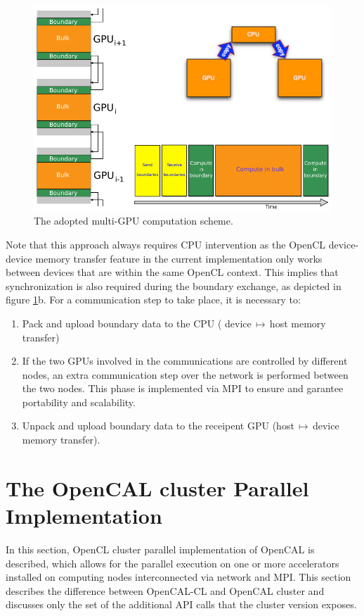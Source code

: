 \begin{figure}
	\centering
		\includegraphics[width=1.0\textwidth]{./images/opencal/multigpu_naive_exchange.png}
		\caption{The adopted multi-GPU computation scheme.}
		\label{fig:multigpu_naive_exchange}
\end{figure}


Note that this approach always requires CPU intervention as the OpenCL device-device memory transfer feature in the current implementation only works between devices that are within the same OpenCL context. This implies that synchronization is also required during the boundary exchange, as depicted in figure \ref{fig:multigpu_naive_exchange}b.
For a communication step to take place, it is necessary to:
\begin{enumerate}
	\item Pack and upload boundary data to the CPU ( device$\,\mapsto\,$host  memory transfer)
	\item If the two GPUs involved in the communications are controlled by different nodes, an extra communication step over the network is performed between the two nodes. This phase is implemented via MPI \cite{mpiStandard:1994} to ensure and garantee portability and scalability. 
	\item Unpack and upload boundary data to the receipent GPU (host$\,\mapsto\,$device memory transfer).
\end{enumerate}


\section{The OpenCAL cluster Parallel Implementation}
  In this section, OpenCL cluster parallel implementation
of OpenCAL is described, which allows for the parallel execution on one or more accelerators installed on computing nodes interconnected via network and MPI.
This section describes the difference between OpenCAL-CL and OpenCAL cluster and discusses only the set of the additional API calls that the cluster version exposes. 

